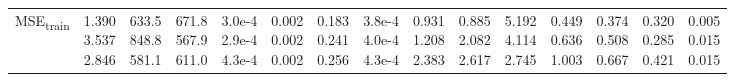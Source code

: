 \begin{landscape}
\begin{table}[t]
{\begin{tabular}{@{}lrrrrrrrrrrrrrr@{}}
MSE\textsubscript{train} & \makecell[r]{1.390\\3.537\\2.846} & \makecell[r]{633.5\\848.8\\581.1} & \makecell[r]{671.8\\567.9\\611.0} & \makecell[r]{3.0e-4\\2.9e-4\\4.3e-4} & \makecell[r]{0.002\\0.002\\0.002} & \makecell[r]{0.183\\0.241\\0.256} & \makecell[r]{3.8e-4\\4.0e-4\\4.3e-4} & \makecell[r]{0.931\\1.208\\2.383} & \makecell[r]{0.885\\2.082\\2.617} & \makecell[r]{5.192\\4.114\\2.745} & \makecell[r]{0.449\\0.636\\1.003} & \makecell[r]{0.374\\0.508\\0.667} & \makecell[r]{0.320\\0.285\\0.421} & \makecell[r]{0.005\\0.015\\0.015} \\

\end{tabular}}
\end{table}
\end{landscape}
